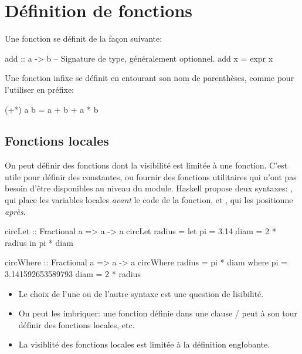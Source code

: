 \section{Définition de fonctions}
\label{defining-functions}

Une fonction se définit de la façon suivante:

\begin{haskellcode}
add :: a -> b  -- Signature de type, généralement optionnel.
add x = expr x
\end{haskellcode}

Une fonction infixe se définit en entourant son nom de parenthèses, comme pour l'utiliser en préfixe:

\begin{haskellcode}
(+*) a b = a + b + a * b
\end{haskellcode}

\subsection{Fonctions locales}

On peut définir des fonctions dont la visibilité est limitée à une fonction. C'est utile pour définir des constantes, ou fournir des fonctions utilitaires qui n'ont pas besoin d'être disponibles au niveau du module. Haskell propose deux syntaxes: , qui place les variables locales \emph{avant} le code de la fonction, et ,  qui les positionne \emph{après}.

\begin{halfwidth}
\begin{haskellcode}
circLet :: Fractional a => a -> a
circLet radius = let pi   = 3.14
                     diam = 2 * radius
                 in pi * diam
\end{haskellcode}
\end{halfwidth}\hfill%
\begin{halfwidth}
	\begin{haskellcode}
circWhere :: Fractional a => a -> a
circWhere radius = pi * diam
    where pi   = 3.141592653589793
          diam = 2 * radius
	\end{haskellcode}
\end{halfwidth}

\begin{itemize}
\item Le choix de l'une ou de l'autre syntaxe est une question de lisibilité.
\item On peut les imbriquer: une fonction définie dans une clause / peut à son tour définir des fonctions locales, etc.
\item La visiblité des fonctions locales est limitée à la définition englobante.
\end{itemize}

